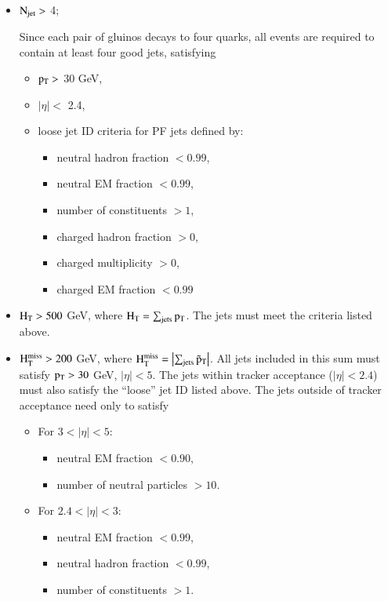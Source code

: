 \begin{itemize}

\item $\rm N_{jet} > $ 4;

Since each pair of gluinos decays to four quarks, all events are required to contain
at least four good jets, satisfying


\begin{itemize}

\item $\rm p_{T} > $  30 GeV,

\item $|\eta| < $ 2.4, 

\item  loose jet ID criteria for PF jets defined by: 

\begin{itemize}
    \item neutral hadron fraction $<0.99$,
    \item neutral EM fraction $<0.99$,
    \item number of constituents $>1$,
    \item charged hadron fraction $>0$,
    \item charged multiplicity $>0$,
    \item charged EM fraction $<0.99$
    \end{itemize}




\end{itemize}




\item $\rm H_{T} > 500 $ GeV, where $\rm H_{T} = \sum_{\mathrm{jets}} p_{T} $.
  The jets must meet the criteria listed above. 

\item $\rm H_{T}^{miss} > 200 $ GeV, where $\rm H_{T}^{miss} = \left|\sum_{\mathrm{jets}} \vec{p}_T\right|$.
  All jets included in this sum must satisfy $\rm p_{T} > 30$ GeV, $|\eta|
  < 5$. The jets within tracker acceptance ($|\eta| <2.4$) must also satisfy the ``loose''
  jet ID listed above.  The jets outside of tracker acceptance need only to satisfy

  \begin{itemize}
\item For $3<|\eta|<5$:
  \begin{itemize}
  \item neutral EM fraction $<0.90$,
  \item number of neutral particles $>10$.
  \end{itemize}
\item For $2.4<|\eta|<3$:
  \begin{itemize}
  \item neutral EM fraction $<0.99$,
  \item neutral hadron fraction $<0.99$,
  \item number of constituents $>1$.
  \end{itemize}
  \end{itemize}



\end{itemize}
